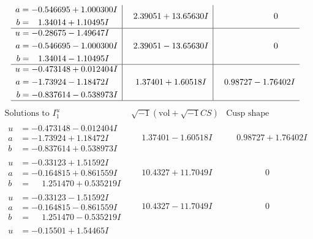 \documentclass[1p]{elsarticle_modified}
\theoremstyle{definition}
\newcommand{\I}{\sqrt{-1}}
\begin{document}
$$\begin{array}{c|c|c}
\begin{aligned}
a &= -0.546695 + 1.000300 I \\
b &= \phantom{-}1.34014 + 1.10495 I\end{aligned}
 & \phantom{-}2.39051 + 13.65630 I & \phantom{-0.000000 } 0 \\ \hline\begin{aligned}
u &= -0.28675 - 1.49647 I \\
a &= -0.546695 - 1.000300 I \\
b &= \phantom{-}1.34014 - 1.10495 I\end{aligned}
 & \phantom{-}2.39051 - 13.65630 I & \phantom{-0.000000 } 0 \\ \hline\begin{aligned}
u &= -0.473148 + 0.012404 I \\
a &= -1.73924 - 1.18472 I \\
b &= -0.837614 - 0.538973 I\end{aligned}
 & \phantom{-}1.37401 + 1.60518 I & \phantom{-}0.98727 - 1.76402 I\\
 \hline 
 \end{array}$$\newpage$$\begin{array}{c|c|c}  
\text{Solutions to }I^u_{1}& \I (\text{vol} + \sqrt{-1}CS) & \text{Cusp shape}\\
 \hline 
\begin{aligned}
u &= -0.473148 - 0.012404 I \\
a &= -1.73924 + 1.18472 I \\
b &= -0.837614 + 0.538973 I\end{aligned}
 & \phantom{-}1.37401 - 1.60518 I & \phantom{-}0.98727 + 1.76402 I \\ \hline\begin{aligned}
u &= -0.33123 + 1.51592 I \\
a &= -0.164815 + 0.861559 I \\
b &= \phantom{-}1.251470 + 0.535219 I\end{aligned}
 & \phantom{-}10.4327 + 11.7049 I & \phantom{-0.000000 } 0 \\ \hline\begin{aligned}
u &= -0.33123 - 1.51592 I \\
a &= -0.164815 - 0.861559 I \\
b &= \phantom{-}1.251470 - 0.535219 I\end{aligned}
 & \phantom{-}10.4327 - 11.7049 I & \phantom{-0.000000 } 0 \\ \hline\begin{aligned}
u &= -0.15501 + 1.54465 I \\

\end{aligned}
\end{array}$$
\end{document}

